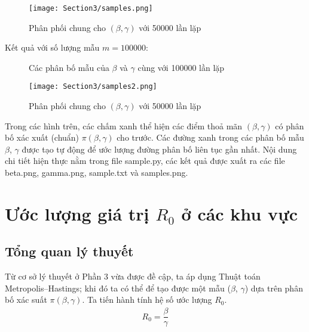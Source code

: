 \documentclass[a4paper]{article}
\begin{document}
\begin{figure}[h!]
    \centering
    \texttt{[image: Section3/samples.png]}
    \caption{Phân phối chung cho $(\beta, \gamma)$ với 50000 lần lặp}
\end{figure}

\newpage
Kết quả với số lượng mẫu $m=100000$: 

\begin{figure}[h!]
    \centering
    \newline
    \newline
    \label{pic: test_SIR_1}
    \caption{Các phân bố mẫu của $\beta$ và $\gamma$ cùng với 100000 lần lặp}
\end{figure}

\begin{figure}[h!]
    \centering
    \texttt{[image: Section3/samples2.png]}
    \caption{Phân phối chung cho $(\beta, \gamma)$ với 50000 lần lặp}
\end{figure}

Trong các hình trên, các chấm xanh thể hiện các điểm thoả mãn $(\beta, \gamma)$ có phân bố xác xuất (chuẩn) $\pi(\beta, \gamma)$ cho trước. Các đường xanh trong các phân bố mẫu $\beta$, $\gamma$ được tạo tự động để ước lượng đường phân bố liên tục gần nhất. Nội dung chi tiết hiện thực nằm trong file sample.py, các kết quả được xuất ra các file beta.png, gamma.png, sample.txt và samples.png. 
    
\newpage
\section{Ước lượng giá trị $R_0$ ở các khu vực}
\subsection{Tổng quan lý thuyết}
Từ cơ sở lý thuyết ở Phần 3 vừa được đề cập, ta áp dụng Thuật toán Metropolis–Hastings; khi đó ta có thể để tạo được một mẫu ($\beta$, $\gamma$) dựa trên phân bố xác suất $\pi(\beta, \gamma)$.
\newline Ta tiến hành tính hệ số ước lượng $R_0$.
\begin{align*}
    R_0 = \dfrac{\beta }{\gamma }
\end{align*}
\end{document}
